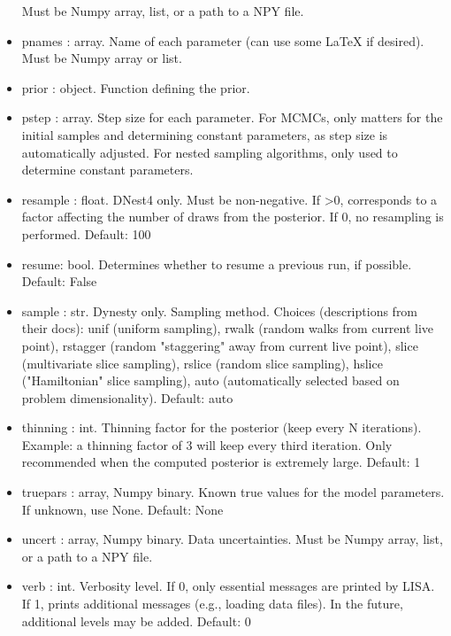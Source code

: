 \documentclass[letterpaper, 12pt]{article}
\begin{document}
\begin{itemize}
                        Must be Numpy array, list, or a path to a NPY file.
\item pnames : array. Name of each parameter (can use some LaTeX if  
                          desired). 
                          Must be Numpy array or list.
\item prior : object. Function defining the prior.
\item pstep : array. Step size for each parameter.  For MCMCs, only  
                         matters for the initial samples and determining  
                         constant parameters, as step size is  
                         automatically adjusted.  For nested sampling  
                         algorithms, only used to determine constant  
                         parameters.
\item resample : float. DNest4 only. Must be non-negative.  
                         If >0, corresponds to a factor affecting the 
                         number of draws from the posterior.  If 0, no 
                         resampling is performed.  Default: 100
\item resume: bool.  Determines whether to resume a previous run, if possible. 
                     Default: False
\item sample : str. Dynesty only. Sampling method. Choices  
                        (descriptions from their docs): unif (uniform  
                        sampling), rwalk (random walks from current live  
                        point), rstagger (random "staggering" away from  
                        current live point), slice (multivariate slice  
                        sampling), rslice (random slice sampling), hslice  
                        ("Hamiltonian" slice sampling), auto  
                        (automatically selected based on problem  
                        dimensionality).  Default: auto
\item thinning : int. Thinning factor for the posterior  
                      (keep every N iterations).  
                      Example: a thinning factor of 3 will keep every  
                      third iteration.  Only recommended when the  
                      computed posterior is extremely large.   
                      Default: 1
\item truepars : array, Numpy binary. Known true values for the model  
                          parameters.  If unknown, use None.  Default: None
\item uncert : array, Numpy binary. Data uncertainties. 
                        Must be Numpy array, list, or a path to a NPY file.
\item verb : int. Verbosity level.  If 0, only essential messages 
                       are printed by LISA.  If 1, prints additional 
                       messages (e.g., loading data files).  
                       In the future, additional levels may be added.  
                       Default: 0
\end{itemize}
\end{document}
